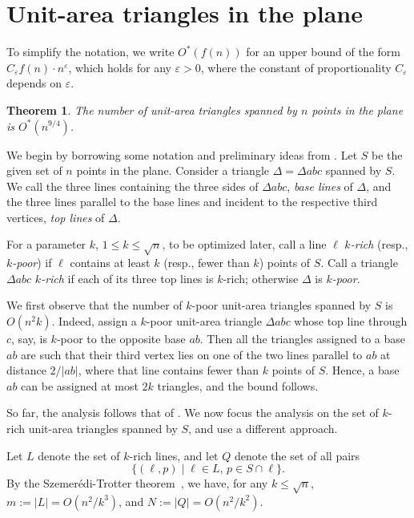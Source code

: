 \documentclass[12pt]{article}
\def\eps{{\varepsilon}}
\newtheorem{theorem}{Theorem}[section]
\begin{document}
\section{Unit-area triangles in the plane}
\label{sec:unit2}

To simplify the notation, we write $O^*(f(n))$ for an upper bound of
the form $C_\eps f(n)\cdot n^\eps$, which holds for any $\eps>0$,
where the constant of proportionality $C_\eps$ depends on $\eps$.

\begin{theorem}\label{thm:unit2}
The number of unit-area triangles spanned by $n$ points in the plane
is $O^*(n^{9/4})$.
\end{theorem}
We begin by borrowing some notation and preliminary ideas from
\cite{DST08}.
Let $S$ be the given set of $n$ points in the plane. Consider a triangle
$\Delta=\Delta{abc}$ spanned by $S$. We call the three lines containing the
three sides of $\Delta{abc}$, {\em base lines} of $\Delta$, and the
three lines parallel to the base lines and incident to the respective
third vertices, {\em top lines} of $\Delta$.

For a parameter $k$, $1\leq k\leq \sqrt{n}$, to be optimized
later, call a line $\ell$ {\em $k$-rich} (resp., {\em $k$-poor}) if
$\ell$ contains at least $k$ (resp., fewer than $k$) points of $S$.
Call a triangle $\Delta{abc}$ {\em $k$-rich} if each of its three top
lines is $k$-rich; otherwise $\Delta$ is {\em $k$-poor}. 

We first observe that the number of $k$-poor unit-area triangles
spanned by $S$ is $O(n^2k)$. Indeed, assign a $k$-poor unit-area
triangle $\Delta{abc}$ whose top line through $c$, say, is $k$-poor
to the opposite base $ab$. Then all the triangles assigned to a base
$ab$ are such that their third vertex lies on one of the two lines
parallel to $ab$ at distance $2/|ab|$, where that line contains
fewer than $k$ points of $S$. Hence, a base $ab$ can be assigned at
most $2k$ triangles, and the bound follows.

So far, the analysis follows that of \cite{DST08}.
We now focus the analysis on the set of $k$-rich unit-area triangles
spanned by $S$, and use a different approach.

Let $L$ denote the set of $k$-rich lines, and let $Q$ denote the set 
of all pairs
$$\{ (\ell,p) \mid \ell\in L,\, p\in S\cap\ell \}.$$
By the Szemer\'edi-Trotter theorem~\cite{ST83}, we have,
for any $k\leq \sqrt{n}$, $m:=|L|=O(n^2/k^3)$, and
$N:=|Q|=O(n^2/k^2)$.
\end{document}
